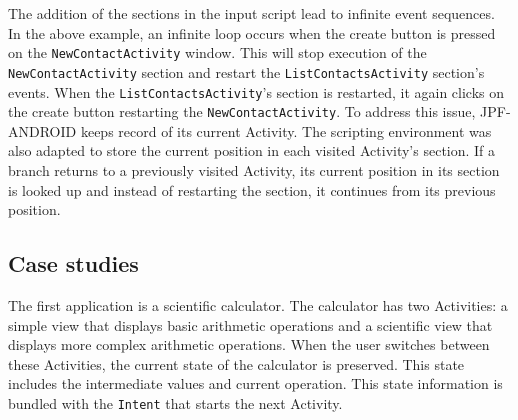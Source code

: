 \documentclass{acm_proc_article-sp}
\begin{document}
The addition of the sections in the input script lead to infinite event sequences. In the above example, an infinite loop occurs when the
create button is pressed on the \texttt{NewContactActivity} window. This will stop execution of the \texttt{NewContactActivity} section and restart
the \texttt{ListContactsActivity} section's events. When the \texttt{ListContactsActivity}'s section is restarted, it again clicks on the create button
restarting the \texttt{NewContactActivity}. To address this issue, JPF-ANDROID keeps record of its current Activity. The scripting environment was
also adapted to store the current position in each visited Activity's section. If a branch returns to a previously visited
Activity, its current position in its section is looked up and instead of restarting the section, it continues from its previous position.

\subsection{Case studies}
The first application is a scientific calculator. The calculator has two Activities: a simple view that
displays basic arithmetic operations and a scientific view that displays more complex arithmetic operations. When the user switches
between these Activities, the current state of the calculator is preserved. This state includes the intermediate values and current
operation. This state information is bundled with the \texttt{Intent} that starts the next Activity.
\end{document}
